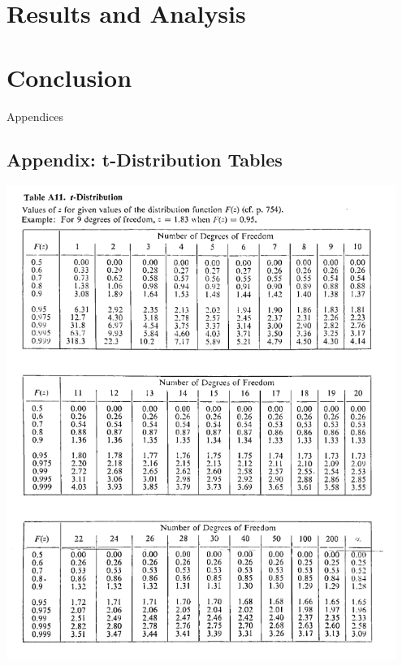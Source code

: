\documentclass{article}
\begin{document}
\section{Results and Analysis}

\section{Conclusion}

\newpage
\thispagestyle{empty}  %
\begin{center}
	\vspace*{\fill}
	{\Huge Appendices}
	\vspace*{\fill}
\end{center}

\newpage
\begin{appendices}
\pagestyle{fancy}
\renewcommand{\thefigure}{A\arabic{figure}}
\setcounter{figure}{0}

\section*{Appendix: t-Distribution Tables}
\hypertarget{1}{\includegraphics[width=0.95\textwidth]{t_distribution_Table_lecture3.png}}
\end{appendices}
\end{document}
